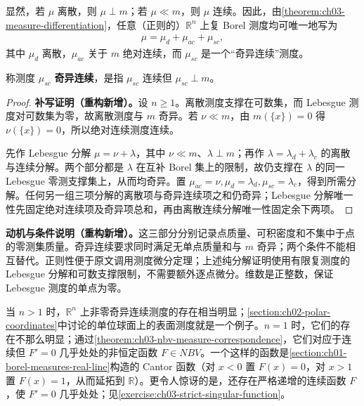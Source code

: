 \documentclass[../../main.tex]{subfiles}%
\begin{document}
\begin{proposition}\label{proposition:ch03-three-part-decomposition}
显然，若 $\mu$ 离散，则 $\mu\perp m$；若 $\mu\ll m$，则 $\mu$ 连续。因此，由\cref{theorem:ch03-measure-differentiation}，任意（正则的）$\mathbb R^n$ 上复 Borel 测度均可唯一地写为
\begin{align*}
\mu=\mu_d+\mu_{ac}+\mu_{sc},
\end{align*}
其中 $\mu_d$ 离散，$\mu_{ac}$ 关于 $m$ 绝对连续，而 $\mu_{sc}$ 是一个“奇异连续”测度。
\end{proposition}
\begin{definition}[奇异连续测度]\label{definition:ch03-singular-continuous-measure}
称测度 $\mu_{sc}$ \textbf{奇异连续}，是指 $\mu_{sc}$ 连续但 $\mu_{sc}\perp m$。
\end{definition}
\begin{proof}
\textbf{补写证明（重构新增）。}设 $n\ge1$。离散测度支撑在可数集，而 Lebesgue 测度对可数集为零，故离散测度与 $m$ 奇异。若 $\nu\ll m$，由 $m(\{x\})=0$ 得 $\nu(\{x\})=0$，所以绝对连续测度连续。

先作 Lebesgue 分解 $\mu=\nu+\lambda$，其中 $\nu\ll m$、$\lambda\perp m$；再作 $\lambda=\lambda_d+\lambda_c$ 的离散与连续分解。两个部分都是 $\lambda$ 在互补 Borel 集上的限制，故仍支撑在 $\lambda$ 的同一 Lebesgue 零测支撑集上，从而均奇异。置 $\mu_{ac}=\nu,\mu_d=\lambda_d,\mu_{sc}=\lambda_c$，得到所需分解。任何另一组三项分解的离散项与奇异连续项之和仍奇异；Lebesgue 分解唯一性先固定绝对连续项及奇异项总和，再由离散连续分解唯一性固定余下两项。
\end{proof}
\begin{remark}
\textbf{动机与条件说明（重构新增）。}这三部分分别记录点质量、可积密度和不集中于点的零测集质量。奇异连续要求同时满足无单点质量和与 $m$ 奇异；两个条件不能相互替代。正则性便于原文调用测度微分定理；上述纯分解证明使用有限复测度的 Lebesgue 分解和可数支撑限制，不需要额外逐点微分。维数是正整数，保证 Lebesgue 测度的单点为零。
\end{remark}

\begin{examples}\label{examples:ch03-singular-continuous-examples}
当 $n>1$ 时，$\mathbb R^n$ 上非零奇异连续测度的存在相当明显；\cref{section:ch02-polar-coordinates}中讨论的单位球面上的表面测度就是一个例子。$n=1$ 时，它们的存在不那么明显；通过\cref{theorem:ch03-nbv-measure-correspondence}，它们对应于连续但 $F'=0$ 几乎处处的非恒定函数 $F\in NBV$。一个这样的函数是\cref{section:ch01-borel-measures-real-line}构造的 Cantor 函数（对 $x<0$ 置 $F(x)=0$，对 $x>1$ 置 $F(x)=1$，从而延拓到 $\mathbb R$）。更令人惊讶的是，还存在严格递增的连续函数 $F$，使 $F'=0$ 几乎处处；见\cref{exercise:ch03-strict-singular-function}。
\end{examples}
\end{document}
